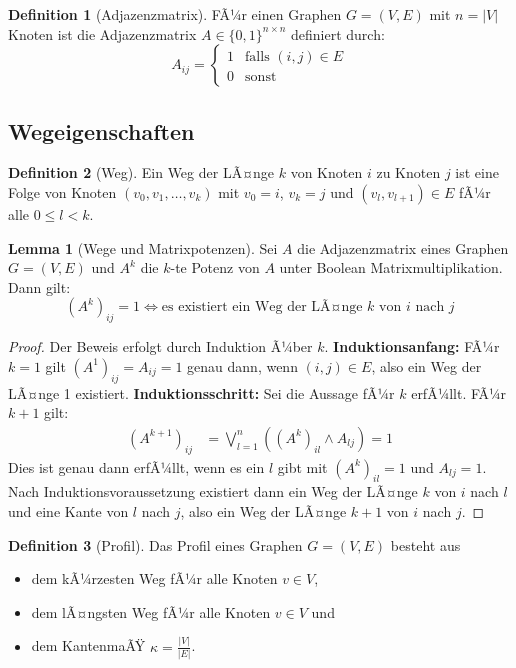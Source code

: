 ﻿\documentclass[a4paper,12pt]{article}
\theoremstyle{definition}
\newtheorem{definition}{Definition}
\newtheorem{lemma}{Lemma}
\begin{document}
	\begin{definition}[Adjazenzmatrix]
		FÃ¼r einen Graphen $G = (V, E)$ mit $n = |V|$ Knoten ist die Adjazenzmatrix $A \in \{0,1\}^{n \times n}$ definiert durch:
		\[
		A_{ij} = \begin{cases} 1 & \text{falls } (i,j) \in E \\ 0 & \text{sonst} \end{cases}
		\]
	\end{definition}
	
	\subsection{Wegeigenschaften}
	\begin{definition}[Weg]
		Ein Weg der LÃ¤nge $k$ von Knoten $i$ zu Knoten $j$ ist eine Folge von Knoten $(v_0, v_1, \ldots, v_k)$ mit $v_0 = i$, $v_k = j$ und $(v_l, v_{l+1}) \in E$ fÃ¼r alle $0 \leq l < k$.
	\end{definition}
	
	\begin{lemma}[Wege und Matrixpotenzen]
		Sei $A$ die Adjazenzmatrix eines Graphen $G = (V,E)$ und $A^k$ die $k$-te Potenz von $A$ unter Boolean Matrixmultiplikation. Dann gilt:
		\[
		(A^k)_{ij} = 1 \Leftrightarrow \text{es existiert ein Weg der LÃ¤nge } k \text{ von } i \text{ nach } j
		\]
	\end{lemma}
	
	\begin{proof}
		Der Beweis erfolgt durch Induktion Ã¼ber $k$.\newline
		\textbf{Induktionsanfang:} FÃ¼r $k=1$ gilt $(A^1)_{ij} = A_{ij} = 1$ genau dann, wenn $(i,j) \in E$, also ein Weg der LÃ¤nge 1 existiert.\newline
		\textbf{Induktionsschritt:} Sei die Aussage fÃ¼r $k$ erfÃ¼llt. FÃ¼r $k+1$ gilt:
		\begin{align*}
			(A^{k+1})_{ij} &= \bigvee_{l=1}^{n} ((A^k)_{il} \wedge A_{lj}) = 1
		\end{align*}
		Dies ist genau dann erfÃ¼llt, wenn es ein $l$ gibt mit $(A^k)_{il} = 1$ und $A_{lj} = 1$. Nach Induktionsvoraussetzung existiert dann ein Weg der LÃ¤nge $k$ von $i$ nach $l$ und eine Kante von $l$ nach $j$, also ein Weg der LÃ¤nge $k+1$ von $i$ nach $j$.
	\end{proof}
	
	\begin{definition}[Profil]
		Das Profil eines Graphen $G=(V, E)$ besteht aus 
		\begin{itemize}
			\item[-] dem kÃ¼rzesten Weg fÃ¼r alle Knoten $v \in V$,
			\item[-] dem lÃ¤ngsten Weg fÃ¼r alle Knoten $v \in V$ und
			\item[-] dem KantenmaÃŸ $\kappa = \frac{\left|V\right|}{\left|E\right|}$.
		\end{itemize}
	\end{definition}
	
\end{document}
